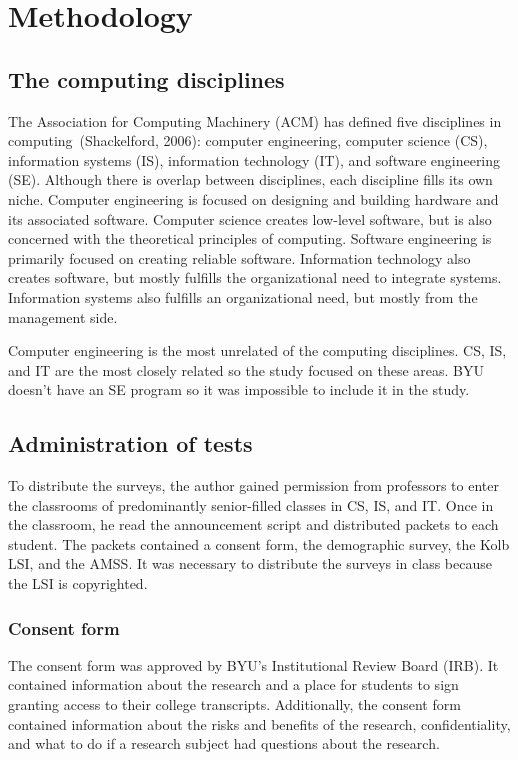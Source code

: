 \chapter{Methodology}\label{chp:chapter3}
\section{The computing disciplines}
The Association for Computing Machinery (ACM) has defined five disciplines in com\-put\-ing~(Shackelford, 2006): computer engineering, computer science (CS), information systems (IS), information technology (IT), and software engineering (SE). Although there is overlap between disciplines, each discipline fills its own niche. Computer engineering is focused on designing and building hardware and its associated software. Computer science creates low-level software, but is also concerned with the theoretical principles of computing. Software engineering is primarily focused on creating reliable software. Information technology also creates software, but mostly fulfills the organizational need to integrate systems. Information systems also fulfills an organizational need, but mostly from the management side.

Computer engineering is the most unrelated of the computing disciplines. CS, IS, and IT are the most closely related so the study focused on these areas. BYU doesn't have an SE program so it was impossible to include it in the study.

\section{Administration of tests}
To distribute the surveys, the author gained permission from professors to enter the classrooms of predominantly senior-filled classes in CS, IS, and IT. Once in the classroom, he read the announcement script and distributed packets to each student. The packets contained a consent form, the demographic survey, the Kolb LSI, and the AMSS. It was necessary to distribute the surveys in class because the LSI is copyrighted.

\subsection{Consent form}
The consent form was approved by BYU's Institutional Review Board (IRB). It contained information about the research and a place for students to sign granting access to their college transcripts. Additionally, the consent form contained information about the risks and benefits of the research, confidentiality, and what to do if a research subject had questions about the research.

